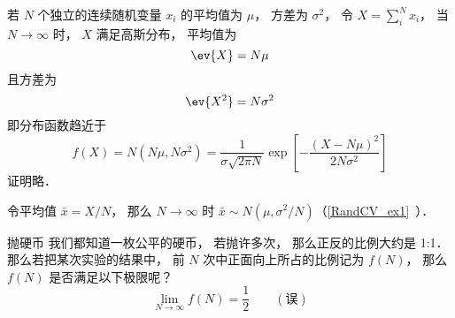 
\begin{issues}
\issueDraft
\end{issues}


若 $N$ 个独立的连续随机变量 $x_i$ 的平均值为 $\mu$， 方差为 $\sigma^2$， 令 $X = \sum_i^N x_i$， 当 $N \to \infty$ 时， $X$ 满足高斯分布， 平均值为
\begin{equation}
\ev{X} = N\mu
\end{equation}
且方差为
\begin{equation}
\ev{X^2} = N\sigma^2
\end{equation}
即分布函数趋近于
\begin{equation}
f(X) = N(N\mu, N\sigma^2) = \frac{1}{\sigma\sqrt{2\pi N}} \exp[-\frac{(X-N\mu)^2}{2N\sigma^2}]
\end{equation}
证明略．

令平均值 $\bar x = X/N$， 那么 $N\to\infty$ 时 $\bar x\sim N(\mu, \sigma^2/N)$（\autoref{RandCV_ex1}~）．

\begin{example}{抛硬币}
我们都知道一枚公平的硬币， 若抛许多次， 那么正反的比例大约是 1:1． 那么若把某次实验的结果中， 前 $N$ 次中正面向上所占的比例记为 $f(N)$， 那么 $f(N)$ 是否满足以下极限呢？
\begin{equation}
\lim_{N\to\infty} f(N) = \frac{1}{2} \qquad (\text{误})
\end{equation}

\end{example}
